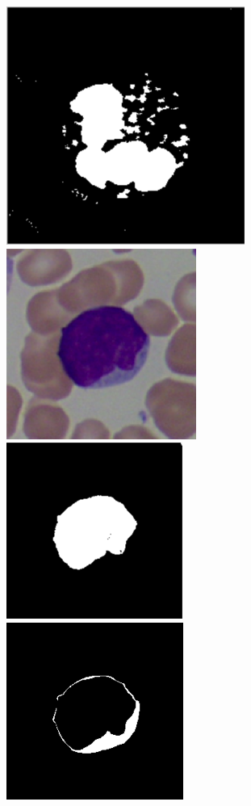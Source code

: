 \documentclass[final,a4paper,12pt,english]{UnicaPhdThesis3}
\begin{document}
\begin{figure}[!b]
		\includegraphics[height=0.10\textheight, width=0.10\textheight]{images/2015_1_caip/2-4}
		\includegraphics[height=0.10\textheight, width=0.10\textheight]{images/2015_1_caip/4-1}
		\includegraphics[height=0.10\textheight, width=0.10\textheight]{images/2015_1_caip/4-2}
		\includegraphics[height=0.10\textheight, width=0.10\textheight]{images/2015_1_caip/4-3}

\end{figure}
\end{document}
